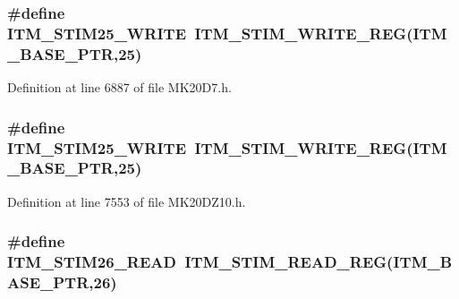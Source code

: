 \subsubsection[{\texorpdfstring{I\+T\+M\+\_\+\+S\+T\+I\+M25\+\_\+\+W\+R\+I\+TE}{ITM_STIM25_WRITE}}]{\setlength{\rightskip}{0pt plus 5cm}\#define I\+T\+M\+\_\+\+S\+T\+I\+M25\+\_\+\+W\+R\+I\+TE~{\bf I\+T\+M\+\_\+\+S\+T\+I\+M\+\_\+\+W\+R\+I\+T\+E\+\_\+\+R\+EG}({\bf I\+T\+M\+\_\+\+B\+A\+S\+E\+\_\+\+P\+TR},25)}\hypertarget{group___i_t_m___register___accessor___macros_ga63f5197346498fb81ab45a43ebc85819}{}\label{group___i_t_m___register___accessor___macros_ga63f5197346498fb81ab45a43ebc85819}


Definition at line 6887 of file M\+K20\+D7.\+h.

\subsubsection[{\texorpdfstring{I\+T\+M\+\_\+\+S\+T\+I\+M25\+\_\+\+W\+R\+I\+TE}{ITM_STIM25_WRITE}}]{\setlength{\rightskip}{0pt plus 5cm}\#define I\+T\+M\+\_\+\+S\+T\+I\+M25\+\_\+\+W\+R\+I\+TE~{\bf I\+T\+M\+\_\+\+S\+T\+I\+M\+\_\+\+W\+R\+I\+T\+E\+\_\+\+R\+EG}({\bf I\+T\+M\+\_\+\+B\+A\+S\+E\+\_\+\+P\+TR},25)}\hypertarget{group___i_t_m___register___accessor___macros_ga63f5197346498fb81ab45a43ebc85819}{}\label{group___i_t_m___register___accessor___macros_ga63f5197346498fb81ab45a43ebc85819}


Definition at line 7553 of file M\+K20\+D\+Z10.\+h.

\subsubsection[{\texorpdfstring{I\+T\+M\+\_\+\+S\+T\+I\+M26\+\_\+\+R\+E\+AD}{ITM_STIM26_READ}}]{\setlength{\rightskip}{0pt plus 5cm}\#define I\+T\+M\+\_\+\+S\+T\+I\+M26\+\_\+\+R\+E\+AD~{\bf I\+T\+M\+\_\+\+S\+T\+I\+M\+\_\+\+R\+E\+A\+D\+\_\+\+R\+EG}({\bf I\+T\+M\+\_\+\+B\+A\+S\+E\+\_\+\+P\+TR},26)}\hypertarget{group___i_t_m___register___accessor___macros_ga8c35b9a8ec5da55c3822fd3960b46ffd}{}\label{group___i_t_m___register___accessor___macros_ga8c35b9a8ec5da55c3822fd3960b46ffd}


